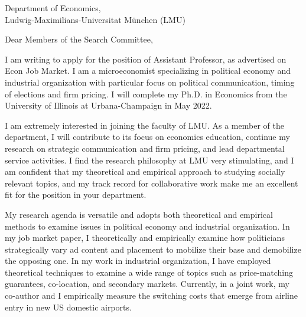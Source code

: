 \documentclass[12pt]{letter}
\begin{document}
\date{}
\begin{letter}{Department of Economics,\\
    Ludwig-Maximilians-Universitat München (LMU)}

\opening{Dear Members of the Search Committee,}

I am writing to apply for the position of Assistant Professor, as advertised on Econ Job Market.
I am a microeconomist specializing in political economy and industrial organization with particular focus on political communication, timing of elections and firm pricing.
I will complete my Ph.D. in Economics from the University of Illinois at Urbana-Champaign in May 2022. 

I am extremely interested in joining the faculty of LMU.
As a member of the department, I will contribute to its focus on economics education,
continue my research on strategic communication and firm pricing, and lead departmental service activities.
I find the research philosophy at LMU very stimulating, and 
I am confident that my theoretical and empirical approach to studying socially relevant topics, 
and my track record for collaborative work make me an excellent fit for the position in your department. 

My research agenda is versatile and adopts both theoretical and empirical methods to examine issues in political economy and industrial organization.
In my job market paper, I theoretically and empirically examine how politicians strategically vary ad content and placement to mobilize their base and demobilize the opposing one.
In my work in industrial organization, I have employed theoretical techniques to examine a wide range of topics such as price-matching guarantees, co-location, and secondary markets.
Currently, in a joint work, my co-author and I empirically measure the switching costs that emerge from airline entry in new US domestic airports.


\end{letter}
\end{document}
